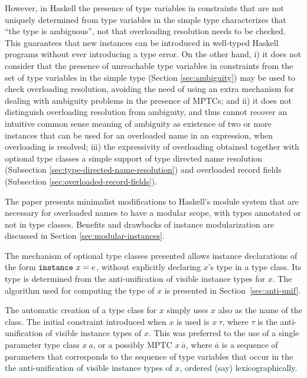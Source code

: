 However, in Haskell the presence of type variables in constraints that
are not uniquely determined from type variables in the simple type
characterizes that ``the type is ambiguous'', not that overloading
resolution needs to be checked.  This guarantees that new instances
can be introduced in well-typed Haskell programs without ever
introducing a type error. On the other hand, i) it does not consider
that the presence of unreachable type variables in constraints from
the set of type variables in the simple type (Section
\ref{sec:ambiguity}) may be used to check overloading resolution,
avoiding the need of using an extra mechanism for dealing with
ambiguity problems in the presence of MPTCs; and ii) it does not
distinguish overloading resolution from ambiguity, and thus cannot
recover an intuitive common sense meaning of ambiguity as existence of
two or more instances that can be used for an overloaded name in an
expression, when overloading is resolved; iii) the expressivity of
overloading obtained together with optional type classes a simple
support of type directed name resolution (Subsection
\ref{sec:type-directed-name-resolution}) and overloaded record fields
(Subsection \ref{sec:overloaded-record-fields}).

The paper presents minimalist modifications to Haskell's module system
that are necessary for overloaded names to have a modular scope, with
types annotated or not in type classes. Benefits and drawbacks of
instance modularization are discussed in Section
\ref{sec:modular-instances}.

The mechanism of optional type classes presented allows instance
declarations of the form $\instance\ x=e$, without explicitly
declaring $x$'s type in a type class.  Its type is determined from the
anti-unification of visible instance types for $x$. The algorithm
used for computing the type of $x$ is presented in
Section~\ref{sec:anti-unif}.

The automatic creation of a type class for $x$ simply uses $x$ also as
the name of the class. The initial constraint introduced when $x$ is
used is $x\:\tau$, where $\tau$ is the anti-unification of visible
instance types of $x$. This was preferred to the use of a single
parameter type class $x\: a$, or a possibly MPTC $x\:\overline{a}$,
where $\overline{a}$ is a sequence of parameters that corresponds to
the sequence of type variables that occur in the the anti-unification
of visible instance types of $x$, ordered (say) lexicographically.

